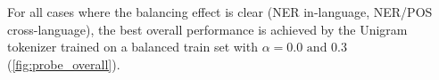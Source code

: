 For all cases where the balancing effect is clear (NER in-language, NER/POS cross-language), the best overall performance is achieved by the Unigram tokenizer trained on a balanced train set with $\alpha=0.0\text{ and }0.3$ (\autoref{fig:probe_overall}).



